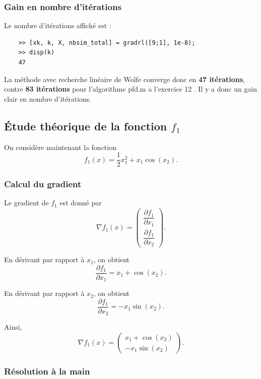 \documentclass[a4paper,12pt]{article}
\begin{document}
	\subsubsection{Gain en nombre d'itérations}
	
	Le nombre d'itérations affiché est :
	\begin{verbatim}
	>> [xk, k, X, nbsim_total] = gradrl([9;1], 1e-8);
	>> disp(k)
	47
	\end{verbatim}
	
	La méthode avec recherche linéaire de Wolfe converge donc en \textbf{47 itérations}, contre \textbf{83 itérations} pour l'algorithme pfd.m a l'exercice 12 . Il y a donc un gain clair en nombre d'itérations.
	
	\subsection{Étude théorique de la fonction $f_1$}
	
	On considère maintenant la fonction
	\[
	f_1(x)=\frac12 x_1^2 + x_1\cos(x_2).
	\]
	
	\subsubsection{Calcul du gradient}
	
	Le gradient de $f_1$ est donné par
	\[
	\nabla f_1(x)=
	\begin{pmatrix}
	\dfrac{\partial f_1}{\partial x_1}\\[0.2cm]
	\dfrac{\partial f_1}{\partial x_2}
	\end{pmatrix}.
	\]
	
	En dérivant par rapport à $x_1$, on obtient
	\[
	\frac{\partial f_1}{\partial x_1}=x_1+\cos(x_2).
	\]
	
	En dérivant par rapport à $x_2$, on obtient
	\[
	\frac{\partial f_1}{\partial x_2}=-x_1\sin(x_2).
	\]
	
	Ainsi,
	\begin{equation}
	\nabla f_1(x)=
	\begin{pmatrix}
	x_1+\cos(x_2)\\
	-x_1\sin(x_2)
	\end{pmatrix}.
	\end{equation}
	
	\subsubsection{Résolution à la main}
	
\end{document}
